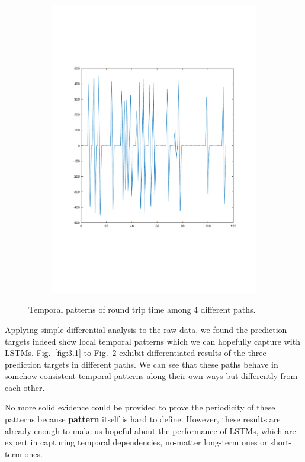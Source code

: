 \documentclass[sigconf]{acmart}
\begin{document}
\begin{figure}[!htp]
\begin{subfigure}[t]{0.4\linewidth}
		\includegraphics[width=0.95\linewidth, trim={100 100 0 0}, clip]{fig/RTT_30}
		\label{fig:3.3d}
	\end{subfigure}
	\caption{Temporal patterns of round trip time among 4 different paths.}
	\label{fig:3.3}
\end{figure}

Applying simple differential analysis to the raw data, we found the prediction targets indeed show local temporal patterns which we can hopefully capture with LSTMs. Fig.~\ref{fig:3.1} to Fig.~\ref{fig:3.3} exhibit differentiated results of the three prediction targets in different paths. We can see that these paths behave in somehow consistent temporal patterns along their own ways but differently from each other.

No more solid evidence could be provided to prove the periodicity of these patterns because \textbf{pattern} itself is hard to define. However, these results are already enough to make us hopeful about the performance of LSTMs, which are expert in capturing temporal dependencies, no-matter long-term ones or short-term ones.
\end{document}
